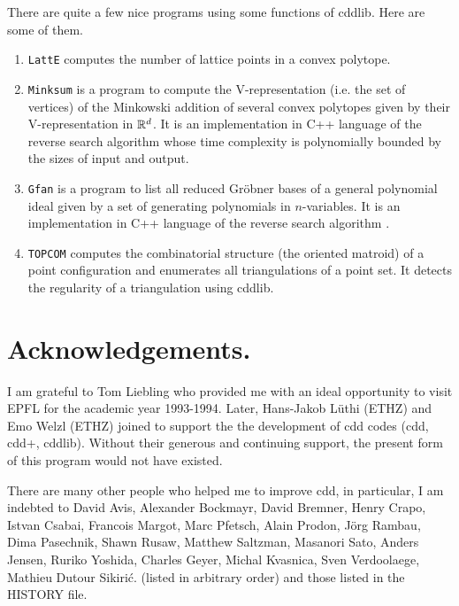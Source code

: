 \documentclass[11pt]{article}
\newcommand {\0} {{\bf 0}}
\newcommand{\R}{{\Bbb R}}
\begin{document}
There are quite a few nice programs using some functions of cddlib.
Here are some of them.


\begin{enumerate}

\item {\tt LattE} \cite{dhhhty-latte-05} computes the number of lattice points
in a convex polytope.

\item {\tt Minksum} \cite{w-msv} is a program to compute the V-representation
(i.e. the set of vertices) of the Minkowski addition of several convex polytopes
given by their V-representation in $\R^d$.  It is an implementation in C++ language
of the reverse search algorithm \cite{f-fzctmacp-04} whose time complexity is
polynomially bounded by the sizes of input and output.

\item {\tt Gfan} \cite{j-gvum} is a program to list all reduced Gr\"obner
bases of a general polynomial ideal given by a set of generating polynomials
in $n$-variables.   It is an implementation in C++ language
of the reverse search algorithm \cite{fjt-cgf-07}.


\item {\tt TOPCOM} \cite{r-topcom-05} computes the combinatorial structure
(the oriented matroid) of a point configuration and enumerates all triangulations
of a point set.   It detects the regularity of a triangulation using cddlib.

\end{enumerate}


\section*{Acknowledgements.}
I am  grateful to Tom  Liebling who
provided me with an ideal opportunity to visit EPFL
for the academic year 1993-1994.  Later, Hans-Jakob L\"uthi (ETHZ) and
Emo Welzl  (ETHZ) joined to support the
the development of cdd codes (cdd, cdd+, cddlib).
Without their generous and continuing support, the present form of
this program would not have existed.

There are many other people who helped me to improve cdd, in particular,
I am indebted to  David Avis,
Alexander Bockmayr, David Bremner, Henry Crapo, Istvan Csabai,
Francois Margot, Marc Pfetsch, Alain Prodon, J\"org Rambau, Dima Pasechnik,
Shawn Rusaw, Matthew Saltzman, Masanori Sato, Anders Jensen,
Ruriko Yoshida, Charles Geyer, Michal Kvasnica, Sven Verdoolaege, 
Mathieu Dutour Sikiri\'c.
 (listed in arbitrary order) and those listed
in the HISTORY file.



%

\end{document}
